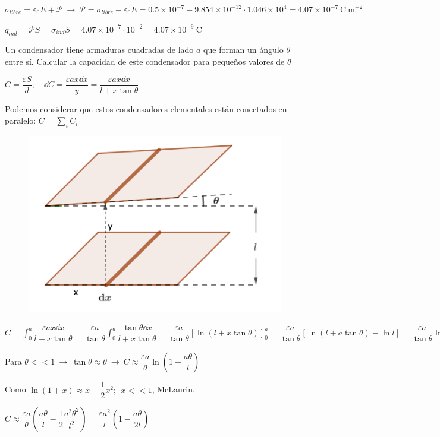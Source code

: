$\sigma_{libre}=\varepsilon_0E+\mathcal P \ \to \ \mathcal P=\sigma_{libre}-\varepsilon_0E=0.5\times 10^{-7}-9.854\times 10^{-12}\cdot 1.046\times 10^4=4.07\times 10^{-7} \ \mathrm{C\ m}^{-2}$

$q_{ind}=\mathcal P S=\sigma_{ind}S=4.07\times 10^{-7} \cdot 10^{-2}=4.07\times 10^{-9} \ \mathrm{C}$

\begin{prob}
Un condensador tiene armaduras cuadradas de lado $a$ que forman un ángulo $\theta$ entre sí. Calcular la capacidad de este condensador para pequeños valores de $\theta$	
\end{prob}

$C=\dfrac {\varepsilon S}{d}; \quad \dd C=\dfrac {\varepsilon a x \dd x}{y}=\dfrac{\varepsilon a x \dd x}{l+x\tan \theta}$

Podemos considerar que estos condensadores elementales están conectados en paralelo: $C=\sum_i C_i$

\begin{figure}[H]
	\centering
	\includegraphics[width=.65\textwidth]{imagenes/imagenes24/T24IM18.png}
\end{figure}

$\displaystyle C=\int_0^a \dfrac{\varepsilon a x \dd x}{l+x\tan \theta}=\dfrac{\varepsilon a}{\tan \theta} \int_0^a \dfrac{\tan \theta  \dd x}{l+x\tan \theta} = \dfrac{\varepsilon a}{\tan \theta} \left[ \ln (l+x\tan \theta) \right]_0^a = \dfrac {\varepsilon a}{\tan \theta} [ \ln(l+a\tan \theta)-\ln l ]=\dfrac{\varepsilon a}{\tan \theta} \ln \left( 1+\dfrac{a \tan \theta}{l} \right) $

Para $\theta <<1 \ \to \ \tan \theta \approx \theta \ \to \ C\approx \dfrac{\varepsilon a}{\theta} \ln \left( 1+\dfrac{a \theta}{l} \right)$

Como $\ln(1+x) \approx x-\dfrac 1 2 x^2;\ \ x<<1$, McLaurin,

$C\approx \dfrac{\varepsilon a}{\theta} \left( \dfrac {a \theta}{l} - \dfrac 1 2 \dfrac {a^2 \theta^2}{l^2} \right)= \dfrac{\varepsilon a^2}{l} \left( 1 - \dfrac{a\theta}{2l} \right)$



